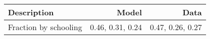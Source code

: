 \begin{tabular}{lrr}
\hline
Description & Model  & Data  \\
\hline
Fraction by schooling & 0.46, 0.31, 0.24  & 0.47, 0.26, 0.27  \\
\hline
\end{tabular}%
